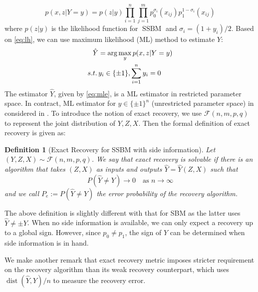 \documentclass[conference]{IEEEtran}
\newtheorem{definition}{Definition}
\DeclareMathOperator{\SSBM}{SSBM}
\DeclareMathOperator{\dist}{dist}
\begin{document}
\begin{equation}\label{eq:lh}
    p(x, z| Y=y) = p(z|y)\prod_{i=1}^n \prod_{j=1}^m p^{\sigma_i}_0(x_{ij})p^{1-\sigma_i}_1(x_{ij}) 
\end{equation}
where $p(z|y)$ is the likelihood function for $\SSBM$ and $\sigma_i = (1+y_i)/2$.
Based on \eqref{eq:lh}, we can use maximum likelihood (ML) method to estimate
$Y$:
\begin{align}
    \hat{Y} &= \arg\max_y p(x,z|Y=y) \notag \\
    s.t.\, & y_i \in \{\pm 1\}, \sum_{i=1}^n y_i=0 \label{eq:mle}
\end{align}
The estimator $\hat{Y}$, given by \eqref{eq:mle}, is a ML estimator in restricted parameter space.
In contract, ML estimator for $y\in \{ \pm 1 \}^n$ (unrestricted parameter space) in considered in \cite{abbe17sideinfo}.
To introduce the notion of exact recovery, we use $\mathcal{F}(n,m,p,q)$ to represent the joint distribution
of $Y,Z, X$.
Then the formal definition of exact
recovery is given as:
\begin{definition}[Exact Recovery for SSBM with side information]
		Let $(Y,Z,X) \sim \mathcal{F}(n,m,p,q)$.
		We say that exact recovery is solvable if there is an algorithm that takes $(Z,X)$ as inputs and outputs $\hat{Y}=\hat{Y}(Z,X)$ such that
		$$
		P(\hat{Y} \neq Y) \to 0
		\text{~~~as~} n\to\infty
		$$
		and we call $P_e:=P(\hat{Y} \neq Y)$ the error probability of the recovery algorithm.
\end{definition}
The above definition is slightly different with that for SBM as the latter uses $\hat{Y} \neq \pm Y$.
When no side information is available, we can only expect a recovery up to a global sign. However,
since $p_0 \neq p_1$, the sign of $Y$ can be determined when side information is in hand.

We make another remark that exact recovery metric imposes stricter requirement on the recovery algorithm than its weak recovery
counterpart, which uses $\dist(\hat{Y}, Y)/n$ to measure the recovery error.
\end{document}
